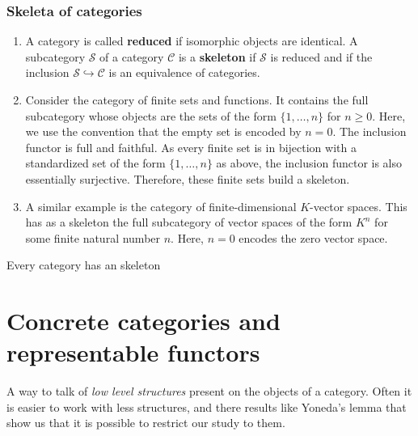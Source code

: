 \begin{example}
\subsubsection*{Skeleta of categories}
\begin{example}
    
    \begin{enumerate}
        \item A category is called \textbf{reduced} if isomorphic objects are identical. A subcategory $\mathcal{S}$ of a category $\mathcal{C}$ is a \textbf{skeleton} if $\mathcal{S}$ is reduced and if the inclusion $\mathcal{S} \hookrightarrow \mathcal{C}$ is an equivalence of categories.
        
        \item Consider the category of finite sets and functions. It contains the full subcategory whose objects are the sets of the form $\{1, \ldots, n\}$ for $n \geq 0$. Here, we use the convention that the empty set is encoded by $n=0$. The inclusion functor is full and faithful. As every finite set is in bijection with a standardized set of the form $\{1, \ldots, n\}$ as above, the inclusion functor is also essentially surjective. Therefore, these finite sets build a skeleton.
        
        \item A similar example is the category of finite-dimensional $K$-vector spaces. This has as a skeleton the full subcategory of vector spaces of the form $K^n$ for some finite natural number $n$. Here, $n=0$ encodes the zero vector space.
    \end{enumerate}
\end{example}


\begin{prop}
    Every category has an skeleton
\end{prop}





\section{Concrete categories and representable functors}

A way to talk of \textit{low level structures} present on the objects of a category. Often it is easier to work with less structures, and there results like Yoneda's lemma that show us that it is possible to restrict our study to them.\\


\end{example}
